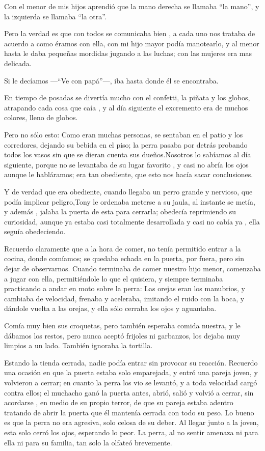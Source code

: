 \documentclass[letterpaper, 12pt]{book}
\begin{document}
Con el menor de mis hijos aprendió que la mano derecha se llamaba ``la mano'', y la izquierda se llamaba ``la otra''. 

Pero la verdad es que con todos se comunicaba bien , a cada uno nos trataba de acuerdo a como éramos con ella, con mi hijo mayor podía manotearlo, y al menor hasta le daba pequeñas mordidas jugando a las luchas; con las mujeres era mas delicada.  

Si le decíamos ---``Ve con papá''---, iba hasta donde él se encontraba.

En tiempo de posadas se divertía mucho con el confetti, la piñata y los globos, atrapando cada cosa que caía , y al día siguiente el excremento era de muchos colores, lleno de globos. 

Pero no sólo esto: Como eran muchas personas, se sentaban en el patio y los corredores, dejando su bebida en el piso; la perra pasaba por detrás probando todos los vasos sin que se dieran cuenta sus dueños.Nosotros lo sabíamos al día siguiente, porque no se levantaba de su lugar favorito , y casi no abría los ojos aunque le habláramos; era tan obediente, que esto nos hacía sacar conclusiones.

Y de verdad que era obediente, cuando llegaba un perro grande y nervioso, que podía implicar peligro,Tony le ordenaba meterse a su jaula, al instante se metía, y además , jalaba la puerta de esta para cerrarla; obedecía reprimiendo su curiosidad, aunque ya estaba casi totalmente desarrollada y casi no cabía ya , ella seguía obedeciendo.

Recuerdo claramente que a la hora de comer, no tenía permitido entrar a la cocina, donde comíamos; se quedaba echada en la puerta, por fuera, pero sin dejar de observarnos. Cuando terminaba de comer nuestro hijo menor, comenzaba a jugar con ella, permitiéndole lo que el quisiera, y siempre terminaba practicando a andar en moto sobre la perra: Las orejas eran los manubrios, y cambiaba de velocidad, frenaba y aceleraba, imitando el ruido con la boca, y dándole vuelta a las orejas, y ella sólo cerraba los ojos y aguantaba.

Comía muy bien sus croquetas, pero también esperaba comida nuestra, y le dábamos los restos, pero nunca aceptó frijoles ni garbanzos, los dejaba muy limpios a un lado. También ignoraba la tortilla.

Estando la tienda cerrada, nadie podía entrar sin provocar su reacción. Recuerdo una ocasión en que la puerta estaba solo emparejada, y entró una pareja joven, y volvieron a cerrar; en cuanto la perra los vio se levantó, y a toda velocidad cargó contra ellos; el muchacho ganó la puerta antes, abrió, salió y volvió a cerrar, sin acordarse , en medio de su propio terror, de que su pareja estaba adentro tratando de abrir la puerta que él mantenía cerrada con todo su peso. Lo bueno es que la perra no era agresiva, solo celosa de su deber. Al llegar junto a la joven, esta solo cerró los ojos, esperando lo peor. La perra, al no sentir amenaza ni para ella ni para su familia, tan solo la olfateó brevemente.
\end{document}
